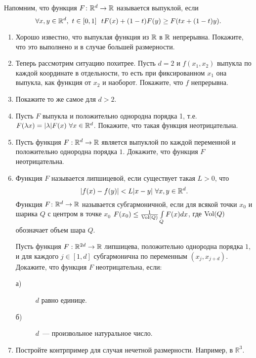 Напомним, что функция $F\colon\mathbb{R}^d\to\mathbb{R}$ называется выпуклой, если
$$\forall x,y\in\mathbb{R}^d,\,\, t\in [0,1]\,\,\,\, tF(x)+(1-t)F(y)\geq F(tx+(1-t)y).$$
\begin{enumerate}
\item Хорошо известно, что выпуклая функция из $\mathbb{R}$ в $\mathbb{R}$ непрерывна. Покажите, что это выполнено и в случае большей размерности.
\item Теперь рассмотрим ситуацию похитрее. Пусть $d=2$ и $f(x_1, x_2)$ выпукла по каждой координате в отдельности, то есть при фиксированном $x_1$ она выпукла, как функция от $x_2$ и наоборот. Покажите, что $f$ непрерывна.
\item Покажите то же самое для $d>2$.
\item Пусть $F$ выпукла и положительно однородна порядка 1, т.е. $F(\lambda x)=|\lambda|F(x)\,\,\forall x\in \mathbb{R}^d$. Покажите, что такая функция неотрицательна.

\item Пусть функция $F: \mathbb{R}^d \to \mathbb{R}$ является выпуклой по каждой переменной и положительно однородна порядка $1$. Докажите, что функция $F$ неотрицательна.

\item Функция $F$ называется липшицевой, если существует такая $L>0$, что $$|f(x)-f(y)|<L|x-y|\,\, \forall x,y\in \mathbb{R}^d.$$ Функция $F\colon \mathbb{R}^d\to \mathbb{R}$ называется субгармоничной, если для всякой точки $x_0$ и шарика $Q$ с центром в точке $x_0$ ${F(x_0)} \leq \frac{1}{\operatorname{Vol}(Q)} \int\limits_{Q} F(x) dx $, где $\operatorname{Vol}(Q)$ обозначает объем шара $Q$.

 Пусть функция $F: \mathbb{R}^{2d} \to \mathbb{R}$ липшицева, положительно однородна порядка $1$, и для каждого $j \in [1,d]$ субгармонична по переменным $(x_j, x_{j+d})$.  Докажите, что функция $F$ неотрицательна, если:
\begin{description}
\item[а)] $d$ равно единице.
\item[б)] $d$~— произвольное натуральное число.

\end{description}

\item Постройте контрпример для случая нечетной размерности. Например, в $\mathbb{R}^3$.
\end{enumerate}